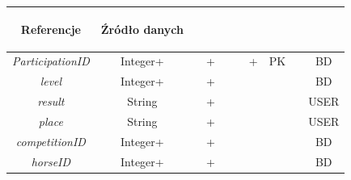\documentclass[12pt,twoside]{report}
\begin{document}
\begin{enumerate}[start=10,label={\bfseries REL\textbackslash\arabic*}]
\begin{table}[H]
\begin{tabular}{|c|c|c|c|c|c|c|c|c|c|}
			\begin{sideways}Referencje \end{sideways}&
			\begin{sideways}Źródło danych\end{sideways}\\
			\hline			
			\textit{ParticipationID}&Integer+&&+&&&+&PK&&BD\\	
			\hline			
			\textit{level}&Integer+&&+&&&&&&BD\\	
			\hline			
			\textit{result}&String&&+&&&&&&USER\\	
			\hline			
			\textit{place}&String&&+&&&&&&USER\\	
			\hline			
			\textit{competitionID}&Integer+&&+&&&&&&BD\\	
			\hline
			\textit{horseID}&Integer+&&+&&&&&&BD\\	
			\hline
		\end{tabular}
	\end{table}
	

\end{enumerate}
\end{document}
